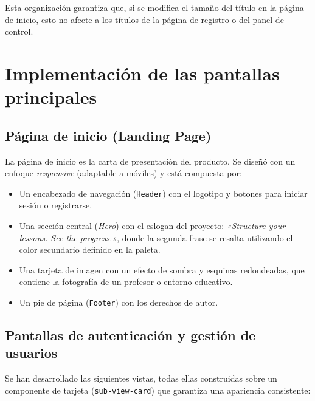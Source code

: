 \documentclass[12pt,a4paper]{report}
\begin{document}
Esta organización garantiza que, si se modifica el tamaño del título en la página de inicio, esto no afecte a los títulos de la página de registro o del panel de control.

\section{Implementación de las pantallas principales}

\subsection{Página de inicio (Landing Page)}

La página de inicio es la carta de presentación del producto. Se diseñó con un enfoque \textit{responsive} (adaptable a móviles) y está compuesta por:

\begin{itemize}
    \item Un encabezado de navegación (\texttt{Header}) con el logotipo y botones para iniciar sesión o registrarse.
    \item Una sección central (\textit{Hero}) con el eslogan del proyecto: \textit{«Structure your lessons. See the progress.»}, donde la segunda frase se resalta utilizando el color secundario definido en la paleta.
    \item Una tarjeta de imagen con un efecto de sombra y esquinas redondeadas, que contiene la fotografía de un profesor o entorno educativo.
    \item Un pie de página (\texttt{Footer}) con los derechos de autor.
\end{itemize}

\subsection{Pantallas de autenticación y gestión de usuarios}

Se han desarrollado las siguientes vistas, todas ellas construidas sobre un componente de tarjeta (\texttt{sub-view-card}) que garantiza una apariencia consistente:
\end{document}
